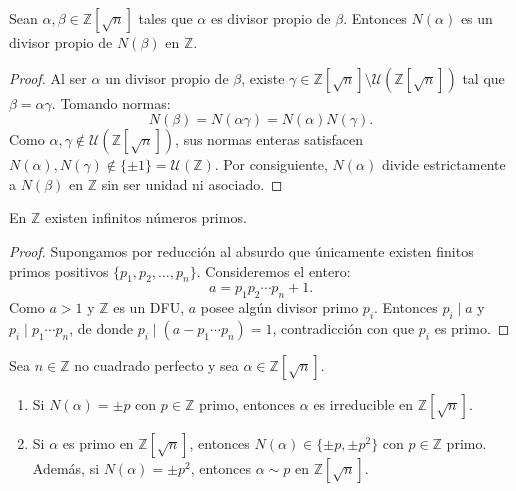 \begin{lema}
    Sean $\alpha, \beta \in \mathbb{Z}[\sqrt{n}]$ tales que $\alpha$ es divisor propio de $\beta$. Entonces $N(\alpha)$ es un divisor propio de $N(\beta)$ en $\mathbb{Z}$.
\end{lema}

\begin{proof}
    Al ser $\alpha$ un divisor propio de $\beta$, existe $\gamma \in \mathbb{Z}[\sqrt{n}] \setminus \mathcal{U}(\mathbb{Z}[\sqrt{n}])$ tal que $\beta = \alpha \gamma$. Tomando normas:
    \[
        N(\beta) = N(\alpha \gamma) = N(\alpha) N(\gamma).
    \]
    Como $\alpha, \gamma \notin \mathcal{U}(\mathbb{Z}[\sqrt{n}])$, sus normas enteras satisfacen $N(\alpha), N(\gamma) \notin \{\pm 1\} = \mathcal{U}(\mathbb{Z})$. Por consiguiente, $N(\alpha)$ divide estrictamente a $N(\beta)$ en $\mathbb{Z}$ sin ser unidad ni asociado.
\end{proof}

\begin{teo}
    En $\mathbb{Z}$ existen infinitos números primos.
\end{teo}

\begin{proof}
    Supongamos por reducción al absurdo que únicamente existen finitos primos positivos $\{p_1, p_2, \dots, p_n\}$. Consideremos el entero:
    \[
        a = p_1 p_2 \cdots p_n + 1.
    \]
    Como $a > 1$ y $\mathbb{Z}$ es un DFU, $a$ posee algún divisor primo $p_i$. Entonces $p_i \mid a$ y $p_i \mid p_1 \cdots p_n$, de donde $p_i \mid (a - p_1 \cdots p_n) = 1$, contradicción con que $p_i$ es primo.
\end{proof}

\begin{prop}
    Sea $n \in \mathbb{Z}$ no cuadrado perfecto y sea $\alpha \in \mathbb{Z}[\sqrt{n}]$.
    \begin{enumerate}[label=\arabic*)]
        \item Si $N(\alpha) = \pm p$ con $p \in \mathbb{Z}$ primo, entonces $\alpha$ es irreducible en $\mathbb{Z}[\sqrt{n}]$.
        \item Si $\alpha$ es primo en $\mathbb{Z}[\sqrt{n}]$, entonces $N(\alpha) \in \{\pm p, \pm p^2\}$ con $p \in \mathbb{Z}$ primo. Además, si $N(\alpha) = \pm p^2$, entonces $\alpha \sim p$ en $\mathbb{Z}[\sqrt{n}]$.
    \end{enumerate}
\end{prop}

